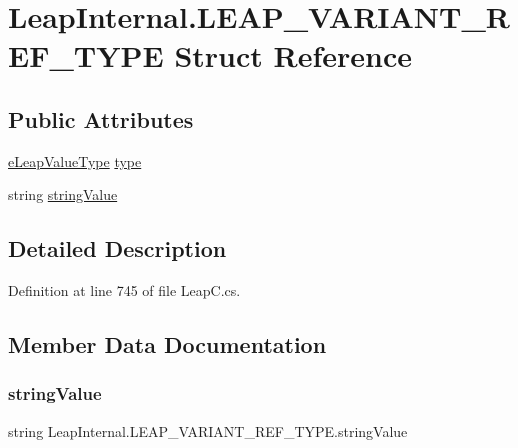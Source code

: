 \hypertarget{struct_leap_internal_1_1_l_e_a_p___v_a_r_i_a_n_t___r_e_f___t_y_p_e}{}\section{Leap\+Internal.\+L\+E\+A\+P\+\_\+\+V\+A\+R\+I\+A\+N\+T\+\_\+\+R\+E\+F\+\_\+\+T\+Y\+PE Struct Reference}
\label{struct_leap_internal_1_1_l_e_a_p___v_a_r_i_a_n_t___r_e_f___t_y_p_e}
\subsection*{Public Attributes}
\begin{DoxyCompactItemize}
\item 
\mbox{\hyperlink{namespace_leap_internal_a9c15e305893cd05c1ec6d65cea48737c}{e\+Leap\+Value\+Type}} \mbox{\hyperlink{struct_leap_internal_1_1_l_e_a_p___v_a_r_i_a_n_t___r_e_f___t_y_p_e_a4abbe7f7993da12ac3755ce4ce9a8acc}{type}}
\item 
string \mbox{\hyperlink{struct_leap_internal_1_1_l_e_a_p___v_a_r_i_a_n_t___r_e_f___t_y_p_e_a211708e0ec5b7b5661a16f8c5e00ea97}{string\+Value}}
\end{DoxyCompactItemize}


\subsection{Detailed Description}


Definition at line 745 of file Leap\+C.\+cs.



\subsection{Member Data Documentation}
\mbox{\label{struct_leap_internal_1_1_l_e_a_p___v_a_r_i_a_n_t___r_e_f___t_y_p_e_a211708e0ec5b7b5661a16f8c5e00ea97}} 
\subsubsection{\texorpdfstring{stringValue}{stringValue}}
{\footnotesize\ttfamily string Leap\+Internal.\+L\+E\+A\+P\+\_\+\+V\+A\+R\+I\+A\+N\+T\+\_\+\+R\+E\+F\+\_\+\+T\+Y\+P\+E.\+string\+Value}



